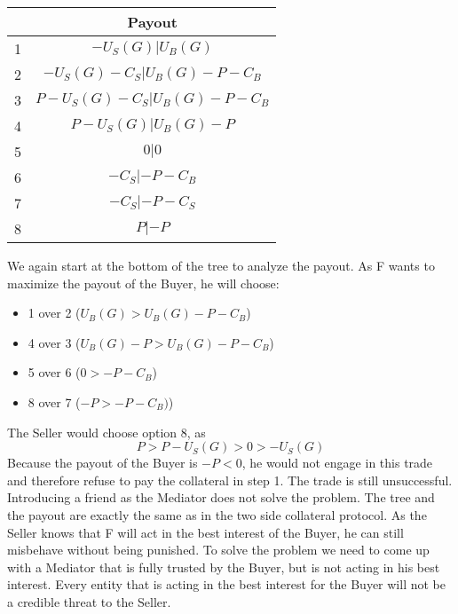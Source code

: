\documentclass{cacthesis}
\begin{document}
\begin{center}
\begin{tabular}{ |c|c| }
\hline
& Payout  \\
\hline
\hline
1& $-U_S(G) | U_B(G)$\\
\hline
2& $-U_S(G) - C_S| U_B(G)- P - C_B $\\
\hline
3&$P-U_S(G) - C_S | U_B(G) -P - C_B$ \\
\hline
4& $P-U_S(G)| U_B(G)-P$\\
\hline
5& $0|0$\\
\hline 
6& $-C_S |-P - C_B$\\
\hline
7& $- C_S| -P-C_S$\\
\hline
8& $P| -P$\\
\hline
\end{tabular}
\end{center}
We again start at the bottom of the tree to analyze the payout. As F wants to maximize the payout of the Buyer, he will choose:
\begin{itemize}
    \item 1 over 2 ($U_B(G) > U_B(G) -P -C_B$)
    \item 4 over 3 ($U_B(G) - P > U_B(G) -P -C_B$)
    \item 5 over 6 ($0 > -P -C_B$)
    \item 8 over 7 ($-P > -P -C_B)$)
\end{itemize}
The Seller would choose option 8, as 
\[P>P-U_S(G)>0>-U_S(G)\]
Because the payout of the Buyer is $-P<0$, he would not engage in this trade and therefore refuse to pay the collateral in step 1. The trade is still unsuccessful. \newline
Introducing a friend as the Mediator does not solve the problem. The tree and the payout are exactly the same as in the two side collateral protocol. As the Seller knows that F will act in the best interest of the Buyer, he can still misbehave without being punished.\newline
To solve the problem we need to come up with a Mediator that is fully trusted by the Buyer, but is not acting in his best interest. Every entity that is acting in the best interest for the Buyer will not be a credible threat to the Seller.
\end{document}
